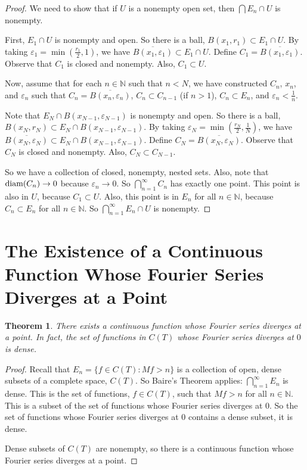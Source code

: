 \documentclass{amsart}
\newcommand{\vep}{\varepsilon}
\newcommand{\N}{\mathbb{N}}
\newcommand{\diam}{\text{\rm diam}}
\newtheorem{thm}{Theorem}[section]
\theoremstyle{definition}
\begin{document}
\begin{proof}
We need to show that if $U$ is a nonempty open set, then $\bigcap E_n \cap U$ is nonempty.

First, $E_1 \cap U$ is nonempty and open.
So there is a ball, $B(x_1,r_1) \subset E_1 \cap U$.
By taking $\vep_1 = \min(\frac{r_1}{2},1)$, we have $\overline{B(x_1,\vep_1)} \subset E_1 \cap U$.
Define $C_1 = \overline{B(x_1,\vep_1)}$.
Observe that $C_1$ is closed and nonempty. Also, $C_1 \subset U$.

Now, assume that for each $n \in \N$ such that $n < N$, we have constructed $C_{n}$, $x_{n}$, and $\vep_{n}$ such that $C_{n} = \overline{B(x_{n},\vep_{n})}$, $C_n \subset C_{n-1}$ (if $n >1$), $C_{n} \subset E_{n}$, and $\vep_{n} < \frac{1}{n}$.

Note that $E_N \cap B(x_{N-1},\vep_{N-1})$ is nonempty and open.
So there is a ball, $B(x_N,r_N) \subset E_N \cap B(x_{N-1},\vep_{N-1})$.
By taking $\vep_N = \min(\frac{r_N}{2},\frac{1}{N})$, we have $\overline{B(x_N,\vep_N)} \subset E_N \cap B(x_{N-1},\vep_{N-1})$.
Define $C_N = \overline{B(x_N,\vep_N)}$.
Observe that $C_N$ is closed and nonempty. Also, $C_N \subset C_{N-1}$.

So we have a collection of closed, nonempty, nested sets.
Also, note that $\diam(C_n) \to 0$ because $\vep_n \to 0$. 
So $\bigcap\limits_{n=1}^\infty C_n$ has exactly one point.
This point is also in $U$, because $C_1 \subset U$.
Also, this point is in $E_n$ for all $n \in \N$, because $C_n \subset E_n$ for all $n \in \N$.
So $\bigcap\limits_{n=1}^\infty E_n \cap U$ is nonempty.

\end{proof}

\section{The Existence of a Continuous Function Whose Fourier Series Diverges at a Point}

\begin{thm}
There exists a continuous function whose Fourier series diverges at a point.
In fact, the set of functions in $C(T)$ whose Fourier series diverges at $0$ is dense.
\end{thm}

\begin{proof}

Recall that 
$E_n = \{f \in C(T) : Mf > n\}$
is a collection of open, dense subsets of a complete space, $C(T)$. 
So Baire's Theorem applies: $\bigcap\limits_{n=1}^\infty E_n $ is dense.
This is the set of functions, $f \in C(T)$, such that $Mf >n$ for all $n \in \N$.
This is a subset of the set of functions whose Fourier series diverges at $0$.
So the set of functions whose Fourier series diverges at $0$ contains a dense subset, it is dense.

Dense subsets of $C(T)$ are nonempty, so there is a continuous function whose Fourier series diverges at a point.

\end{proof}
\end{document}
